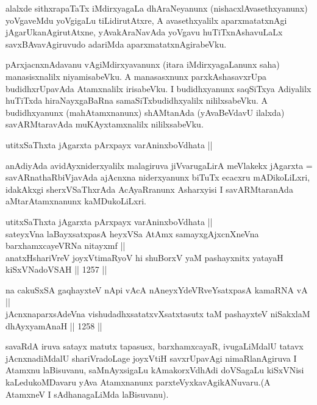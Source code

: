 \begin{artha}
alalxde sithxrapaTaTx iMdirxyagaLa dhAraNeyanunx (nishacxlAvasethxyanunx) yoVgaveMdu yoVgigaLu tiLidirutAtxre, A avasethxyalilx aparxmatatxnAgi jAgarUkanAgirutAtxne, yAvakAraNavAda yoVgavu huTiTxnAshavuLaLx savxBAvavAgiruvudo adariMda aparxmatatxnAgirabeVku.
\end{artha}

\begin{artha}
pArxjacnxnAdavanu vAgiMdirxyavanunx (itara iMdirxyagaLanunx saha) manasisxnalilx niyamisabeVku. A manasasxnunx parxkAshasavxrUpa budidhxrUpavAda Atamxnalilx irisabeVku. I budidhxyanunx saqSiTxya Adiyalilx huTiTxda hiraNayxgaBaRna samaSiTxbudidhxyalilx nililxsabeVku. A budidhxyanunx (mahAtamxnanunx) shAMtanAda (yAvaBeVdavU ilalxda) savARMtaravAda muKAyxtamxnalilx nililxsabeVku.
\end{artha}


\begin{shl}
utitxSaThxta jAgarxta pArxpayx varAninxboVdhata || 
\end{shl}

\begin{artha}
anAdiyAda avidAyxniderxyalilx malagiruva jiVvarugaLirA meVlakekx jAgarxta = savARnathaRbiVjavAda ajAcnxna niderxyanunx biTuTx ecacxru mADikoLiLxri, idakAkxgi sherxVSaThxrAda AcAyaRranunx Asharxyisi I savARMtaranAda aMtarAtamxnanunx kaMDukoLiLxri.
\end{artha}


\begin{shl}
utitxSaThxta jAgarxta pArxpayx varAninxboVdhata || \\
sateyxVna laBayxsatxpasA heyxVSa AtAmx samayxgAjxcnXneVna barxhamxcayeVRNa nitayxmf || \\
anatxHshariVreV joyxVtimaRyoV hi shuBorxV yaM pashayxnitx yatayaH kiSxVNadoVSAH \hfill || 1257 ||  
\end{shl}

\begin{shl}
na cakuSxSA gaqhayxteV nApi vAcA nAneyxYdeVRveYsatxpasA kamaRNA vA || \\
jAcnxnaparxsAdeVna vishudadhxsatatxvXsatxtasutx taM pashayxteV niSakxlaM dhAyxyamAnaH \hfill || 1258 ||  
\end{shl}

\begin{artha}
savaRdA iruva satayx matutx tapasusx, barxhamxcayaR, ivugaLiMdalU tatavx jAcnxnadiMdalU shariVradoLage joyxVtiH savxrUpavAgi nimaRlanAgiruva I Atamxnu laBisuvanu, saMnAyxsigaLu kAmakorxVdhAdi doVSagaLu kiSxVNisi kaLedukoMDavaru yAva Atamxnanunx parxteVyxkavAgikANuvaru.(A AtamxneV I sAdhanagaLiMda laBisuvanu).
\end{artha}

